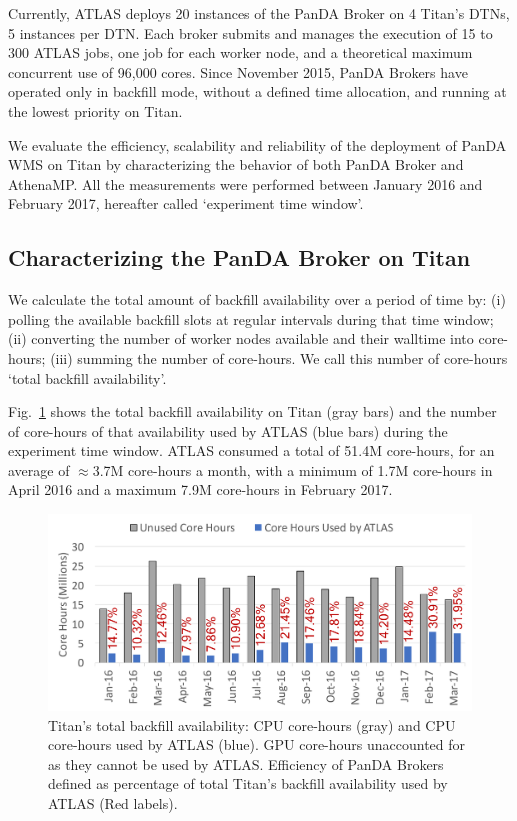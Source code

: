 Currently, ATLAS deploys 20 instances of the PanDA Broker on 4 Titan's DTNs, 5
instances per DTN. Each broker submits and manages the execution of 15 to 300
ATLAS jobs, one job for each worker node, and a theoretical maximum concurrent
use of 96,000 cores. Since November 2015, PanDA Brokers have operated only in
backfill mode, without a defined time allocation, and running at the lowest
priority on Titan.

We evaluate the efficiency, scalability and reliability of the deployment of
PanDA WMS on Titan by characterizing the behavior of both PanDA Broker and
AthenaMP. All the measurements were performed between January 2016 and February
2017, hereafter called `experiment time window'.

\subsection{Characterizing the PanDA Broker on Titan}
\label{ssec:broker_titan}

We calculate the total amount of backfill availability over a period of time by:
(i) polling the available backfill slots at regular intervals during that time
window; (ii) converting the number of worker nodes available and their walltime
into core-hours; (iii) summing the number of core-hours. We call this number of
core-hours `total backfill availability'.

Fig.~\ref{fig:backfill-utilization} shows the total backfill availability on
Titan (gray bars) and the number of core-hours of that availability used by
ATLAS (blue bars) during the experiment time window. ATLAS consumed a total of
51.4M core-hours, for an average of $\approx$3.7M core-hours a month, with a
minimum of 1.7M core-hours in April 2016 and a maximum 7.9M core-hours in
February 2017.

\begin{figure}[!t]
    \includegraphics[clip,width=\columnwidth]{figures/backfill_consumption.pdf}
    \vspace{-0.3in}
    \caption{Titan's total backfill availability: CPU core-hours (gray) and CPU
    core-hours used by ATLAS (blue). GPU core-hours unaccounted for as they
    cannot be used by ATLAS. Efficiency of PanDA Brokers defined as percentage
    of total Titan's backfill availability used by ATLAS (Red labels).}
\label{fig:backfill-utilization}
\end{figure}

